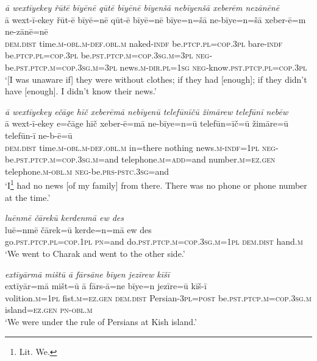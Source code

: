 \ea \label{ŽM.30}
\textit{ā wextīyekey řūtē bīyēnē qūtē bīyēnē bīyenšā nebīyenšā xeberēm nezānēnē} \\ 
\gll ā wext-ī-ekey řūt-ē bīyē=nē qūt-ē bīyē=nē bīye=n=šā ne-bīye=n=šā xeber-ē=m ne-zānē=nē \\ 
 \textsc{dem.dist} time\textsc{.m}\textsc{-obl}\textsc{.m}\textsc{-def}\textsc{.obl}\textsc{.m} naked\textsc{-indf} be\textsc{.ptcp}\textsc{.pl}\textsc{=cop}\textsc{.3pl} bare\textsc{-indf} be\textsc{.ptcp}\textsc{.pl}\textsc{=cop}\textsc{.3pl} be\textsc{.pst}\textsc{.ptcp}\textsc{.m}\textsc{=cop}\textsc{.3sg}\textsc{.m}\textsc{=3pl} \textsc{neg-}be\textsc{.pst}\textsc{.ptcp}\textsc{.m}\textsc{=cop}\textsc{.3sg}\textsc{.m}\textsc{=3pl} news\textsc{.m}\textsc{-dir}\textsc{.pl}\textsc{=\textsc{1sg}} \textsc{neg-}know\textsc{.pst}\textsc{.ptcp}\textsc{.pl}\textsc{=cop}\textsc{.3pl} \\ 
\glt `[I was unaware if] they were without clothes; if they had [enough]; if they didn’t have [enough]. I didn't know their news.'
\z 
 
\ea \label{ŽM.32}
\textit{ā wextīyekey ečāge hīč xeberēmā nebīyenū telefūnīčū žimārew telefūnī nebēw} \\ 
\gll ā wext-ī-ekey e=čāge hīč xeber-ē=mā ne-bīye=n=ū telefūn=īč=ū žimāre=ū telefūn-ī ne-b-ē=ū \\ 
 \textsc{dem.dist} time\textsc{.m}\textsc{-obl}\textsc{.m}\textsc{-def}\textsc{.obl}\textsc{.m} in=there nothing news\textsc{.m}\textsc{-indf}\textsc{=\textsc{1pl}} \textsc{neg-}be\textsc{.pst}\textsc{.ptcp}\textsc{.m}\textsc{=cop}\textsc{.3sg}\textsc{.m}=and telephone\textsc{.m}\textsc{=add}=and number\textsc{.m}\textsc{=ez.gen} telephone\textsc{.m}\textsc{-obl}\textsc{.m} \textsc{neg-}be\textsc{.prs}\textsc{-pstc}\textsc{.3sg}=and \\ 
\glt `I\footnote{Lit. We.}  had no news [of my family] from there. There was no phone or phone number at the time.'
\z 
 
\ea \label{ŽM.34}
\textit{luēnmē čārekū kerdenmā ew des} \\ 
\gll luē=nmē čārek=ū kerde=n=mā ew des \\ 
 go\textsc{.pst}\textsc{.ptcp}\textsc{.pl}\textsc{=cop}\textsc{.\textsc{1pl}} \textsc{pn}=and do\textsc{.pst}\textsc{.ptcp}\textsc{.m}\textsc{=cop}\textsc{.3sg}\textsc{.m}\textsc{=\textsc{1pl}} \textsc{dem.dist} hand\textsc{.m} \\ 
\glt `We went to Charak and went to the other side.'
\z 
 
\ea \label{ŽM.38}
\textit{extīyārmā mištū ā fārsāne bīyen jezīrew kīšī} \\ 
\gll extīyār=mā mišt=ū ā fārs-ā=ne bīye=n jezīre=ū kīš-ī \\ 
 volition\textsc{.m}\textsc{=\textsc{1pl}} fist\textsc{.m}\textsc{=ez.gen} \textsc{dem.dist} Persian\textsc{-3pl}\textsc{=\textsc{post}} be\textsc{.pst}\textsc{.ptcp}\textsc{.m}\textsc{=cop}\textsc{.3sg}\textsc{.m} island\textsc{=ez.gen} \textsc{pn}\textsc{-obl}\textsc{.m} \\ 
\glt `We were under the rule of Persians at Kish island.'
\z 
 
